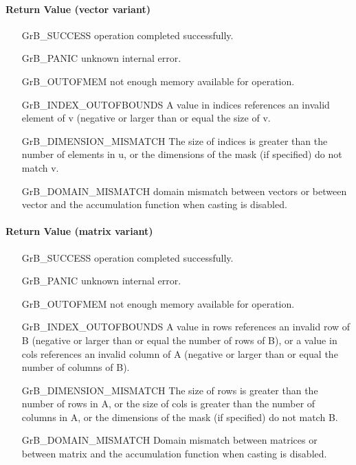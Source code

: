 \paragraph{Return Value (vector variant)}


\begin{itemize}[leftmargin=2.1in]
\item[{\sf GrB\_SUCCESS}]      operation completed successfully.
\item[{\sf GrB\_PANIC}]        unknown internal error.
\item[{\sf GrB\_OUTOFMEM}]     not enough memory available for operation.
\item[{\sf GrB\_INDEX\_OUTOFBOUNDS}]
        A value in {\sf indices} references an invalid element of {\sf v} (negative or larger than or equal the size of {\sf v}.
\item[{\sf GrB\_DIMENSION\_MISMATCH}] 
        The size of {\sf indices} is greater than the number of elements in {\sf u}, or
        the dimensions of the mask (if specified) do not match {\sf v}.
\item[\sf GrB\_DOMAIN\_MISMATCH]  
       domain mismatch between vectors or between vector and the accumulation function when casting is disabled.
\end{itemize}

\paragraph{Return Value (matrix variant)}

\begin{itemize}[leftmargin=2.1in]
\item[{\sf GrB\_SUCCESS}]      operation completed successfully.
\item[{\sf GrB\_PANIC}]        unknown internal error.
\item[{\sf GrB\_OUTOFMEM}]     not enough memory available for operation.
\item[{\sf GrB\_INDEX\_OUTOFBOUNDS}]
        A value in {\sf rows} references an invalid row of {\sf B} (negative or larger than or equal the number of rows of {\sf B}),
        or a value in {\sf cols} references an invalid column of {\sf A} (negative or larger than or equal the number of columns of {\sf B}).
\item[{\sf GrB\_DIMENSION\_MISMATCH}] 
        The size of {\sf rows} is greater than the number of rows in {\sf A}, or
        the size of {\sf cols} is greater than the number of columns in {\sf A}, or
        the dimensions of the mask (if specified) do not match {\sf B}.
\item[\sf GrB\_DOMAIN\_MISMATCH]  
       Domain mismatch between matrices or between matrix and the accumulation function when casting is disabled.
\end{itemize}

